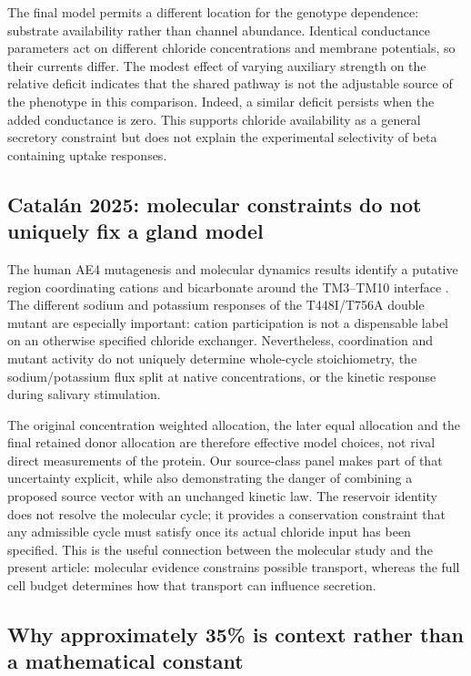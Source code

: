 The final model permits a different location for the genotype dependence: substrate availability rather than channel abundance. Identical conductance parameters act on different chloride concentrations and membrane potentials, so their currents differ. The modest effect of varying auxiliary strength on the relative deficit indicates that the shared pathway is not the adjustable source of the phenotype in this comparison. Indeed, a similar deficit persists when the added conductance is zero. This supports chloride availability as a general secretory constraint but does not explain the experimental selectivity of beta containing uptake responses.

\subsection{Catalán 2025: molecular constraints do not uniquely fix a gland model}

The human AE4 mutagenesis and molecular dynamics results identify a putative region coordinating cations and bicarbonate around the TM3--TM10 interface \citep{Catalan2025}. The different sodium and potassium responses of the T448I/T756A double mutant are especially important: cation participation is not a dispensable label on an otherwise specified chloride exchanger. Nevertheless, coordination and mutant activity do not uniquely determine whole-cycle stoichiometry, the sodium/potassium flux split at native concentrations, or the kinetic response during salivary stimulation.

The original concentration weighted allocation, the later equal allocation and the final retained donor allocation are therefore effective model choices, not rival direct measurements of the protein. Our source-class panel makes part of that uncertainty explicit, while also demonstrating the danger of combining a proposed source vector with an unchanged kinetic law. The reservoir identity does not resolve the molecular cycle; it provides a conservation constraint that any admissible cycle must satisfy once its actual chloride input has been specified. This is the useful connection between the molecular study and the present article: molecular evidence constrains possible transport, whereas the full cell budget determines how that transport can influence secretion.

\subsection{Why approximately 35\% is context rather than a mathematical constant}

